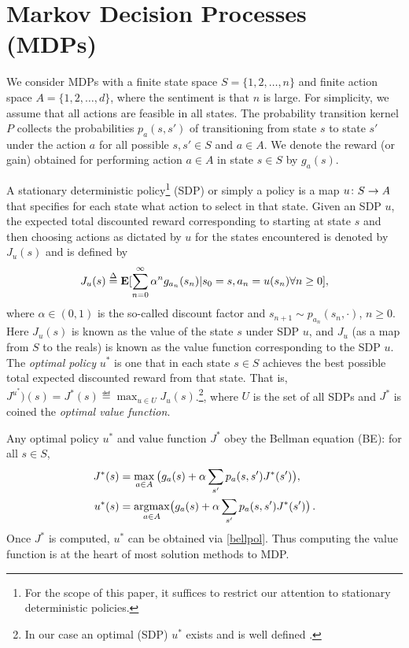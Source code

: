 \section{Markov Decision Processes (MDPs)}
We consider MDPs with a finite state space $S=\{1,2,\ldots,n\}$ and finite action space $A=\{1,2,\ldots,d\}$, where the sentiment is that $n$ is large. For simplicity, we assume that all actions are feasible in all states. The probability transition kernel $P$ collects the probabilities $p_a(s,s')$ of transitioning from state $s$ to state $s'$ under the action $a$ for all possible $s,s'\in S$ and $a\in A$. We denote the reward (or gain) obtained for performing action $a\in A$ in state $s\in S$ by $g_a(s)$.

A stationary deterministic policy\footnote{For the scope of this paper, it suffices to restrict our attention to stationary deterministic policies.} (SDP) or simply a policy is a map $u\colon S\rightarrow A$ that specifies for each state what action to select in that state.
Given an SDP $u$, the expected total discounted reward corresponding to starting at state $s$ and then choosing actions as dictated by $u$ for the states encountered is denoted by $J_u(s)$ and is defined by
\begin{align}
J_u(s)\stackrel{\Delta}{=}\mathbf{E}[\sum_{n=0}^\infty \alpha^n g_{a_n}(s_n)|s_0=s,a_n=u(s_n)\relax{ }\forall n\geq 0],\nonumber
\end{align}
where $\alpha \in (0,1)$ is the so-called discount factor and $s_{n+1} \sim p_{a_n}(s_n,\cdot)$, $n\ge 0$. 
Here $J_u(s)$ is known as the value of the state $s$ under SDP $u$, and $J_u$ (as a map from $S$ to the reals)
is known as the value function corresponding to the SDP $u$.
The \emph{optimal policy} $u^*$ is one that in each state $s\in S$ achieves the best possible total expected discounted reward from that state. That is, $J^{u^*})(s) = J^*(s) \eqdef \max_{u\in U} J_u(s)$.\footnote{In our case an optimal (SDP) $u^*$ exists and is well defined \cite{BertB}.}, where $U$ is the set of all SDPs and $J^*$ is coined the \emph{optimal value function}. 


Any optimal policy $u^*$ and value function $J^*$ obey the Bellman equation (BE): for all $ s \in S$, 
\begin{subequations}\label{bell}
\begin{align}
\label{bellval}J^*(s)&=\max_{ a\in A}\big(g_a(s)+\alpha \sum_{s'}p_a(s,s')J^*(s')\big),\\
\label{bellpol}u^*(s)&= \underset{a\in A}{\argmax}\big(g_a(s)+\alpha \sum_{s'}p_a(s,s')J^*(s')\big)\,.
\end{align}
\end{subequations}
Once $J^*$ is computed, $u^*$ can be obtained via \eqref{bellpol}. Thus computing the value function is at the heart of most solution methods to MDP.

